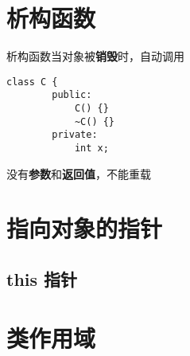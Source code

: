 \section{析构函数}

析构函数当对象被\textbf{销毁}时，自动调用

\begin{lstlisting}[frame=shadowbox]
    class C {
        public:
            C() {}
            ~C() {}
        private:
            int x;
\end{lstlisting}

没有\textbf{参数}和\textbf{返回值}，不能重载

\section{指向对象的指针}

\subsection{this 指针}

\section{类作用域}

\newpage